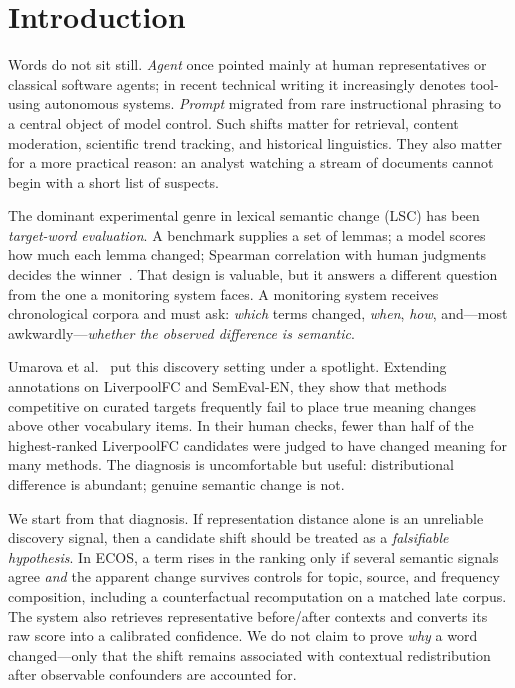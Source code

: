 \documentclass[journal]{IEEEtran}
\begin{document}
\section{Introduction}
\label{sec:intro}

Words do not sit still.
\textit{Agent} once pointed mainly at human representatives or classical software agents; in recent technical writing it increasingly denotes tool-using autonomous systems.
\textit{Prompt} migrated from rare instructional phrasing to a central object of model control.
Such shifts matter for retrieval, content moderation, scientific trend tracking, and historical linguistics.
They also matter for a more practical reason: an analyst watching a stream of documents cannot begin with a short list of suspects.

The dominant experimental genre in lexical semantic change (LSC) has been \emph{target-word evaluation}.
A benchmark supplies a set of lemmas; a model scores how much each lemma changed; Spearman correlation with human judgments decides the winner~\cite{schlechtweg2020semeval,tahmasebi2021survey}.
That design is valuable, but it answers a different question from the one a monitoring system faces.
A monitoring system receives chronological corpora and must ask: \emph{which} terms changed, \emph{when}, \emph{how}, and---most awkwardly---\emph{whether the observed difference is semantic}.

Umarova et al.~\cite{umarova2025discovery} put this discovery setting under a spotlight.
Extending annotations on LiverpoolFC and SemEval-EN, they show that methods competitive on curated targets frequently fail to place true meaning changes above other vocabulary items.
In their human checks, fewer than half of the highest-ranked LiverpoolFC candidates were judged to have changed meaning for many methods.
The diagnosis is uncomfortable but useful: distributional difference is abundant; genuine semantic change is not.

We start from that diagnosis.
If representation distance alone is an unreliable discovery signal, then a candidate shift should be treated as a \emph{falsifiable hypothesis}.
In ECOS, a term rises in the ranking only if several semantic signals agree \emph{and} the apparent change survives controls for topic, source, and frequency composition, including a counterfactual recomputation on a matched late corpus.
The system also retrieves representative before/after contexts and converts its raw score into a calibrated confidence.
We do not claim to prove \emph{why} a word changed---only that the shift remains associated with contextual redistribution after observable confounders are accounted for.
\end{document}
